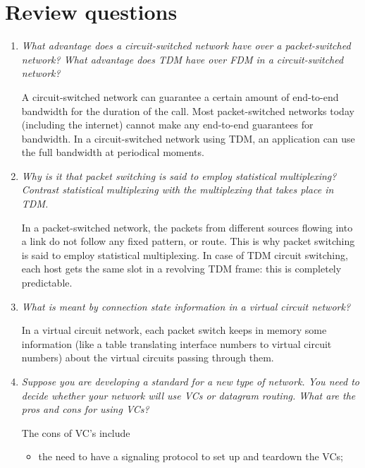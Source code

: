 \section{Review questions}

\begin{enumerate}

  \item \emph{What advantage does a circuit-switched network have over
    a packet-switched network? What advantage does TDM have over FDM
    in a circuit-switched network?}

  A circuit-switched network can guarantee a certain amount of
  end-to-end bandwidth for the duration of the call. Most
  packet-switched networks today (including the internet) cannot make
  any end-to-end guarantees for bandwidth. In a circuit-switched
  network using TDM, an application can use the full bandwidth at
  periodical moments.

  \item \emph{Why is it that packet switching is said to employ
    statistical multiplexing? Contrast statistical multiplexing with
    the multiplexing that takes place in TDM.}

  In a packet-switched network, the packets from different sources
  flowing into a link do not follow any fixed pattern, or route. This
  is why packet switching is said to employ statistical
  multiplexing. In case of TDM circuit switching, each host gets the
  same slot in a revolving TDM frame: this is completely predictable.

  \item \emph{What is meant by connection state information in a
    virtual circuit network?}

  In a virtual circuit network, each packet switch keeps in memory
  some information (like a table translating interface numbers to
  virtual circuit numbers) about the virtual circuits passing through
  them.

  \item \emph{Suppose you are developing a standard for a new type of
    network. You need to decide whether your network will use VCs or
    datagram routing. What are the pros and cons for using VCs?}

   The cons of VC's include
   \begin{itemize}

     \item the need to have a signaling protocol to set up and
       teardown the VCs;
  

\end{itemize}
\end{enumerate}
